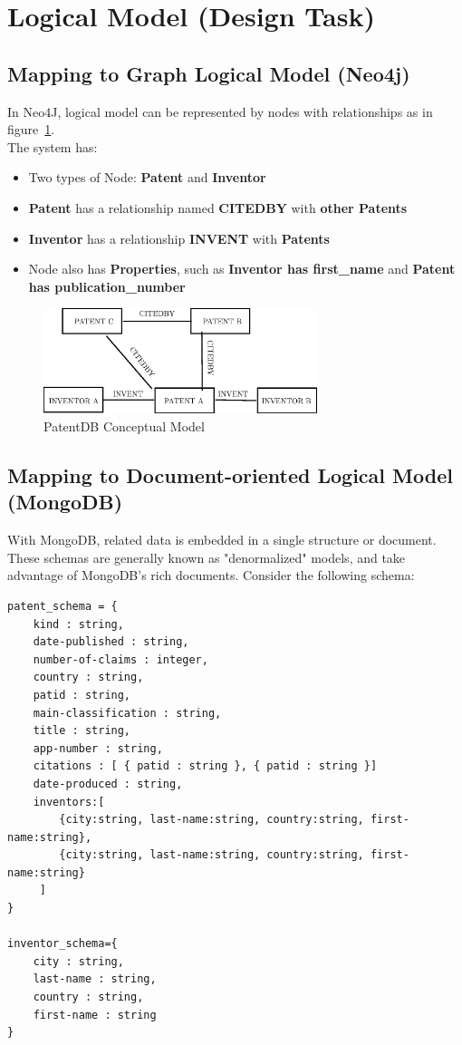 \documentclass{article}
\begin{document}

\section{Logical Model (Design Task)}
\subsection{Mapping to Graph Logical Model (Neo4j)}
In Neo4J, logical model can be represented by nodes with relationships as in figure~\ref{fig:neo4j}.\\
The system has:
\begin{itemize}
\item Two types of Node: \textbf{Patent} and \textbf{Inventor}
\item \textbf{Patent} has a relationship named \textbf{CITEDBY} with \textbf{other Patents}
\item \textbf{Inventor} has a relationship \textbf{INVENT} with \textbf{Patents}
\item Node also has \textbf{Properties}, such as \textbf{Inventor has first\_name} and \textbf{Patent has publication\_number}
\end {itemize}

\begin{figure}[h!]
\centering
\includegraphics[width=80mm,scale=10]{neo4jgraph.eps}
\caption{ PatentDB Conceptual Model} \label{fig:neo4j}
\end{figure}

\subsection{Mapping to Document-oriented Logical Model (MongoDB)}
With MongoDB, related data is embedded in a single structure or document. These schemas are generally known as "denormalized" models, and take advantage of MongoDB's rich documents. Consider the following schema:
\begin{lstlisting}[caption=Document-oriented schema]
patent_schema = {
    kind : string, 
    date-published : string, 
    number-of-claims : integer, 
    country : string, 
    patid : string,
    main-classification : string,
    title : string,
    app-number : string, 
    citations : [ { patid : string }, { patid : string }]
    date-produced : string, 
    inventors:[
    	{city:string, last-name:string, country:string, first-name:string},
    	{city:string, last-name:string, country:string, first-name:string}
     ]       
}

inventor_schema={
    city : string, 
    last-name : string, 
    country : string, 
    first-name : string
}
\end{lstlisting}
\end{document}
